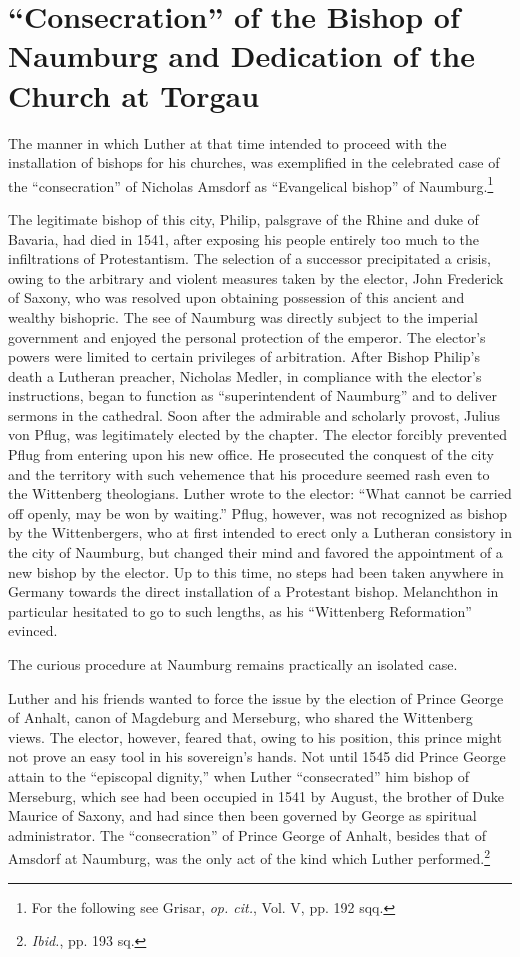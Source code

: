 \section{``Consecration'' of the Bishop of Naumburg and Dedication of the Church at Torgau}

The manner in which Luther at that time intended to proceed with
the installation of bishops for his churches, was exemplified in the
celebrated case of the “consecration” of Nicholas Amsdorf as “Evangelical
bishop” of Naumburg.\footnote
{For the following see Grisar, \textit{op. cit.}, Vol. V, pp. 192 sqq.}

The legitimate bishop of this city, Philip, palsgrave of the Rhine
and duke of Bavaria, had died in 1541, after exposing his people entirely
too much to the infiltrations of Protestantism. The selection of a
successor precipitated a crisis, owing to the arbitrary and violent
measures taken by the elector, John Frederick of Saxony, who was resolved
upon obtaining possession of this ancient and wealthy bishopric. The see
of Naumburg was directly subject to the imperial
government and enjoyed the personal protection of the emperor. The
elector’s powers were limited to certain privileges of arbitration. After
Bishop Philip’s death a Lutheran preacher, Nicholas Medler, in compliance
with the elector’s instructions, began to function as ``superintendent
of Naumburg'' and to deliver sermons in the cathedral.
Soon after the admirable and scholarly provost, Julius von Pflug,
was legitimately elected by the chapter. The elector forcibly prevented
Pflug from entering upon his new office. He prosecuted the
conquest of the city and the territory with such vehemence that his
procedure seemed rash even to the Wittenberg theologians. Luther
wrote to the elector: “What cannot be carried off openly, may be won
by waiting.” Pflug, however, was not recognized as bishop by the
Wittenbergers, who at first intended to erect only a Lutheran consistory
in the city of Naumburg, but changed their mind and favored
the appointment of a new bishop by the elector. Up to this time, no
steps had been taken anywhere in Germany towards the direct installation
of a Protestant bishop. Melanchthon in particular hesitated to go to such
lengths, as his “Wittenberg Reformation” evinced.

The curious procedure at Naumburg remains practically an isolated
case.

Luther and his friends wanted to force the issue by the election
of Prince George of Anhalt, canon of Magdeburg and Merseburg, who
shared the Wittenberg views. The elector, however, feared that, owing
to his position, this prince might not prove an easy tool in his sovereign’s
hands. Not until 1545 did Prince George attain to the “episcopal dignity,”
when Luther “consecrated” him bishop of Merseburg,
which see had been occupied in 1541 by August, the brother of Duke
Maurice of Saxony, and had since then been governed by George as
spiritual administrator. The “consecration” of Prince George of Anhalt,
besides that of Amsdorf at Naumburg, was the only act of the
kind which Luther performed.\footnote{\textit{Ibid.}, pp. 193 sq.}

